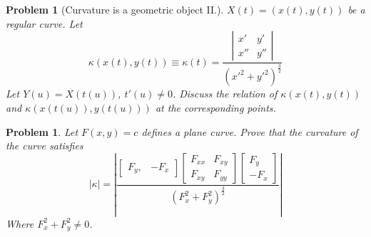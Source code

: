 \documentclass[12pt,a4paper]{article}
\newcounter{theProblemCounter}
\newtheorem{problem}[theProblemCounter]{Problem}
\begin{document}
\begin{problem}[Curvature is a geometric object II.]
$X(t) = (x(t), y(t))$ be a regular curve. Let
\[ \kappa(x(t), y(t)) \equiv \kappa(t) = \frac{
\left|
\begin{array}{cc} x' & y' \\ x'' & y'' \end{array}
\right|
}{(x'^2+y'^2)^\frac32} \]
Let $Y(u) = X(t(u))$, $t'(u)\ne 0$. Discuss the relation of $\kappa(x(t), y(t))$ and $\kappa(x(t(u)), y(t(u)))$ at the corresponding points.
\end{problem}

\begin{problem}
Let $F(x, y)=c$ defines a plane curve. Prove that the curvature of the curve satisfies
\[
|\kappa| = \left|
\frac{
\left[
\begin{array}{cc} F_y, & -F_x\end{array}
\right]
\left[
\begin{array}{cc} F_{xx} & F_{xy} \\ F_{xy} & F_{yy} \end{array}
\right]
\left[
\begin{array}{c} F_y \\ -F_x\end{array}
\right]
}{(F_x^2+F_y^2)^\frac32}
\right|
\]
Where $F_x^2+F_y^2\ne 0$.
\end{problem}
\end{document}
